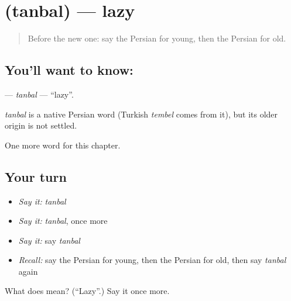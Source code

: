 \section[\texorpdfstring{\fa{تنبل} (tanbal)}{تنبل (tanbal)}]{ (tanbal) — lazy}

\label{lesson:FA-C125-tanbal}



\begin{quote}
Before the new one: say the Persian for young, then the Persian for old.
\end{quote}

\subsection*{You'll want to know: }
\textbf{} — \emph{tanbal} — \textquotedblleft{}lazy\textquotedblright{}.

\begin{cousinweb}
\emph{tanbal} is a native Persian word (Turkish \emph{tembel} comes from it), but its older origin is not settled.
\end{cousinweb}

\begin{grammarlens}[title={What you've built}]
One more word for this chapter.
\end{grammarlens}

\subsection*{Your turn}
\begin{itemize}
\raggedright
  \item \emph{Say it:} \emph{tanbal}
  \item \emph{Say it:} \emph{tanbal}, once more
  \item \emph{Say it:} say \emph{tanbal}
  \item \emph{Recall:} say the Persian for young, then the Persian for old, then say \emph{tanbal} again
\end{itemize}

\begin{tcolorbox}[breakable,colback=teal!4,colframe=teal!35!black,title={Before you move on}]
What does  mean? (\textquotedblleft{}Lazy\textquotedblright{}.) Say it once more.
\end{tcolorbox}
